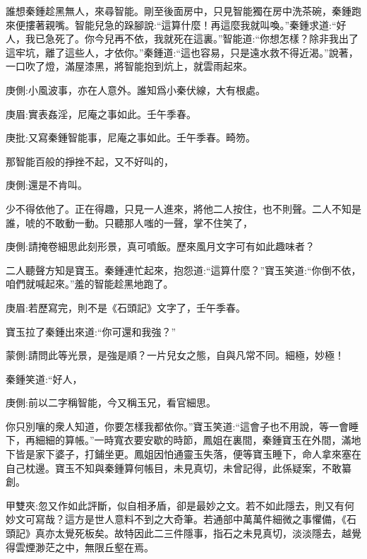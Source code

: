 \begin{parag}
    誰想秦鍾趁黑無人，來尋智能。剛至後面房中，只見智能獨在房中洗茶碗，秦鍾跑來便摟著親嘴。智能兒急的跺腳說:“這算什麼！再這麼我就叫喚。”秦鍾求道:“好人，我已急死了。你今兒再不依，我就死在這裏。”智能道:“你想怎樣？除非我出了這牢坑，離了這些人，才依你。”秦鍾道:“這也容易，只是遠水救不得近渴。”說著，一口吹了燈，滿屋漆黑，將智能抱到炕上，就雲雨起來。\begin{note}庚側:小風波事，亦在人意外。誰知爲小秦伏線，大有根處。\end{note}\begin{note}庚眉:實表姦淫，尼庵之事如此。壬午季春。\end{note}\begin{note}庚批:又寫秦鍾智能事，尼庵之事如此。壬午季春。畸笏。\end{note}那智能百般的掙挫不起，又不好叫的，\begin{note}庚側:還是不肯叫。\end{note}少不得依他了。正在得趣，只見一人進來，將他二人按住，也不則聲。二人不知是誰，唬的不敢動一動。只聽那人嗤的一聲，掌不住笑了，\begin{note}庚側:請掩卷細思此刻形景，真可噴飯。歷來風月文字可有如此趣味者？\end{note}二人聽聲方知是寶玉。秦鍾連忙起來，抱怨道:“這算什麼？”寶玉笑道:“你倒不依，咱們就喊起來。”羞的智能趁黑地跑了。\begin{note}庚眉:若歷寫完，則不是《石頭記》文字了，壬午季春。\end{note}寶玉拉了秦鍾出來道:“你可還和我強？”\begin{note}蒙側:請問此等光景，是強是順？一片兒女之態，自與凡常不同。細極，妙極！\end{note}秦鍾笑道:“好人，\begin{note}庚側:前以二字稱智能，今又稱玉兄，看官細思。\end{note}你只別嚷的衆人知道，你要怎樣我都依你。”寶玉笑道:“這會子也不用說，等一會睡下，再細細的算帳。”一時寬衣要安歇的時節，鳳姐在裏間，秦鍾寶玉在外間，滿地下皆是家下婆子，打鋪坐更。鳳姐因怕通靈玉失落，便等寶玉睡下，命人拿來塞在自己枕邊。寶玉不知與秦鍾算何帳目，未見真切，未曾記得，此係疑案，不敢纂創。\begin{note}甲雙夾:忽又作如此評斷，似自相矛盾，卻是最妙之文。若不如此隱去，則又有何妙文可寫哉？這方是世人意料不到之大奇筆。若通部中萬萬件細微之事懼備，《石頭記》真亦太覺死板矣。故特因此二三件隱事，指石之未見真切，淡淡隱去，越覺得雲煙渺茫之中，無限丘壑在焉。\end{note}
\end{parag}


